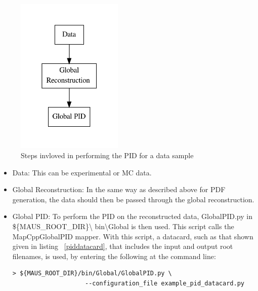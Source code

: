 \begin{figure}[h!]
\begin{center} 
\includegraphics[width=2in]{reconstruction/globalpid/pidperfflow.pdf} 
\caption{Steps invloved in performing the PID for a data sample}
\label{pidperf}
\end{center} 
\end{figure}
			
\begin{itemize}
\item Data: This can be experimental or MC data.
\item Global Reconstruction: In the same way as described above for PDF generation, the 
data should then be passed through the global reconstruction.
\item Global PID: To perform the PID on the reconstructed data, GlobalPID.py in \$\{MAUS\_ROOT\_DIR\}\textbackslash 
bin\textbackslash Global is then used. This script calls the 
MapCppGlobalPID mapper. With this script, a datacard, such as that 
shown given in listing ~\ref{piddatacard}, that includes the input and output root filenames, is used, by entering the following at the command line:
\begin{verbatim}
> ${MAUS_ROOT_DIR}/bin/Global/GlobalPID.py \
                    --configuration_file example_pid_datacard.py
\end{verbatim}
\end{itemize}

